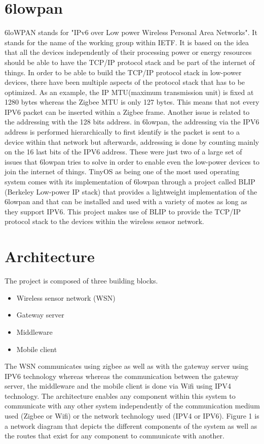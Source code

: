 \documentclass[conference]{IEEEtran}
\begin{document}
\section{6lowpan}
6loWPAN stands for  "IPv6 over Low power Wireless Personal Area Networks". It stands for the name of the working group within IETF. It is based on the idea that all the devices independently of their processing power or energy resources should be able to have the TCP/IP protocol stack and be part of the internet of things. In order to be able to build the TCP/IP protocol stack in low-power devices, there have been multiple aspects of the protocol stack that has to be optimized. As an example, the IP MTU(maximum transmission unit) is fixed at 1280 bytes whereas the Zigbee MTU is only 127 bytes. This means that not every IPV6 packet can be inserted within a Zigbee frame. Another issue is related to the addressing with the 128 bits address. in 6lowpan, the addressing via the IPV6 address is performed hierarchically to first identify is the packet is sent to a device within that network but afterwards, addressing is done by counting mainly on the 16 last bits of the IPV6 address. These were just two of a large set of issues that 6lowpan tries to solve in order to enable even the low-power devices to join the internet of things. TinyOS as being one of the most used operating system comes with its implementation of 6lowpan through a project called BLIP (Berkeley Low-power IP stack) that provides a lightweight implementation of the 6lowpan and that can be installed and used with a variety of motes as long as they support IPV6. This project makes use of BLIP to provide the TCP/IP protocol stack to the devices within the wireless sensor network.

\section{Architecture}
The project is composed of three building blocks. 
\begin{itemize}
\item Wireless sensor network (WSN)
\item Gateway server
\item Middleware
\item Mobile client
\end{itemize}
The WSN communicates using zigbee as well as with the gateway server using IPV6 technology whereas whereas the communication between the gateway server, the middleware and the mobile client is done via Wifi using IPV4 technology. The architecture enables any component within this system to communicate with any other system independently of the communication medium used (Zigbee or Wifi) or the network technology used (IPV4 or IPV6). Figure 1 is a network diagram that depicts the different components of the system as well as the routes that exist for any component to communicate with another.
\end{document}
